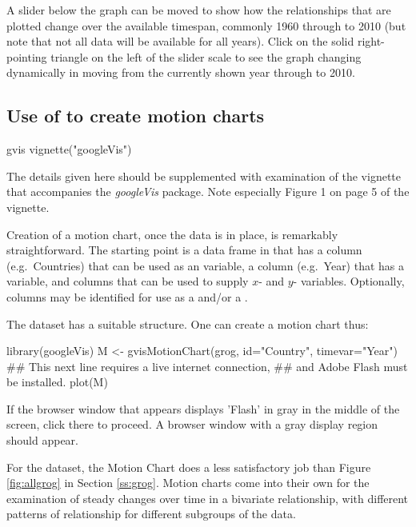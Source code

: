 A slider below the graph can be moved to show how the relationships
that are plotted change over the available timespan, commonly 1960
through to 2010 (but note that not all data will be available for all
years).  Click on the solid right-pointing triangle on the left of
the slider scale to see the graph changing dynamically in moving from the
currently shown year through to 2010.

\subsection*{Use of  to create motion charts}\label{ss:gvis}

\begin{SaveVerbatim}{gvis}
vignette("googleVis")
\end{SaveVerbatim}

The details given here should be supplemented with examination
of the vignette that accompanies the {\em
googleVis} package.  Note especially Figure 1 on page 5 of the
vignette.

Creation of a motion chart, once the data is in place, is remarkably
straightforward. The starting point is a data frame in that has a
column (e.g.\ Countries) that can be used as an  variable, a
column (e.g.\ Year) that has a  variable, and columns
that can be used to supply $x$- and $y$- variables.  Optionally,
columns may be identified for use as a  and/or a
.

The dataset  has a suitable
structure.  One can create a motion chart thus:
\begin{minipage}[t]{1.075\textwidth}
\begin{Schunk}
\begin{Sinput}
library(googleVis)
M <- gvisMotionChart(grog, id="Country", timevar="Year")
## This next line requires a live internet connection,
## and Adobe Flash must be installed.
plot(M)
\end{Sinput}
\end{Schunk}
\end{minipage}
If the browser window that appears displays 'Flash' in gray in the
middle of the screen, click there to proceed.  A browser window with a
gray display region should appear.

For the  dataset, the Motion Chart does a less satisfactory
job than Figure \ref{fig:allgrog} in Section \ref{ss:grog}.  Motion
charts come into their own for the examination of steady changes over
time in a bivariate relationship, with different patterns of
relationship for different subgroups of the data.

